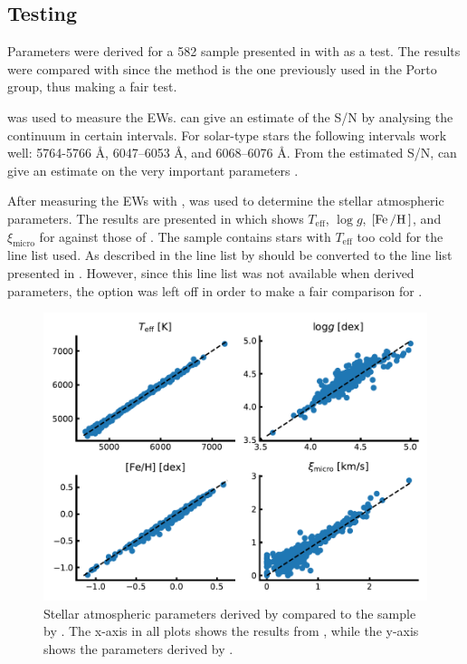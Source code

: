 \subsection{Testing }
\label{sec:fasma_test}

Parameters were derived for a 582 sample presented in \citet{Sousa2011} with  as a test.
The results were compared with \citet{Sousa2011} since the method is the one previously used in the
Porto group, thus making a fair test.

 was used to measure the EWs.  can give an estimate of the S/N by analysing
the continuum in certain intervals. For solar-type stars the following intervals work well:
5764-5766 \AA{}, 6047–6053 \AA{}, and 6068–6076 \AA{}. From the estimated S/N,  can give
an estimate on the very important  parameters \citep[see][for more information]{Sousa2015a}.

After measuring the EWs with ,  was used  to determine the stellar
atmospheric parameters. The results are presented in  which shows
$T_\mathrm{eff}$, $\log g$, $[\ion{Fe}/\ion{H}]$, and $\xi_\mathrm{micro}$ for  against
those of \citet{Sousa2011}. The sample contains stars with $T_\mathrm{eff}$ too cold for the line
list used. As described in  the line list by \citet{Sousa2008a} should be
converted to the line list presented in \citet{Tsantaki2013}. However, since this line list was not
available when \citet{Sousa2011} derived parameters, the  option was left off in
order to make a fair comparison for .

\begin{figure}[htpb!]
    \centering
    \includegraphics[width=1.0\linewidth]{figures/FASMAtest.pdf}
    \caption{Stellar atmospheric parameters derived by  compared to the sample by
             \citet{Sousa2011}. The x-axis in all plots shows the results from , while
             the y-axis shows the parameters derived by \citet{Sousa2011}.}
    \label{fig:fasma_test}
\end{figure}


